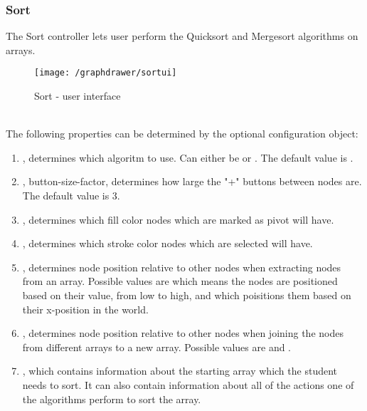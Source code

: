 \subsubsection{Sort}
The Sort controller lets user perform the Quicksort and Mergesort algorithms on arrays.
\begin{figure}[h]
    \centering
    \texttt{[image: /graphdrawer/sortui]}
    \caption{Sort - user interface}
    \label{fig:graphdrawerSortUserInterface}
\end{figure}
\\[11pt]
The following properties can be determined by the optional configuration object:
\begin{enumerate}
    \item {}, determines which algoritm to use. Can either be  or . The default value is .
    \item {}, button-size-factor, determines how large the "+" buttons between nodes are. The default value is 3.
    \item {}, determines which fill color nodes which are marked as pivot will have.
    \item {}, determines which stroke color nodes which are selected will have.
    \item {}, determines node position relative to other nodes when extracting nodes from an array. Possible values are  which means the nodes are positioned based on their value, from low to high, and  which poisitions them based on their x-position in the world.
    \item {}, determines node position relative to other nodes when joining the nodes from different arrays to a new array. Possible values are  and .
    \item {}, which contains information about the starting array which the student needs to sort. It can also contain information about all of the actions one of the algorithms perform to sort the array.
\end{enumerate}

